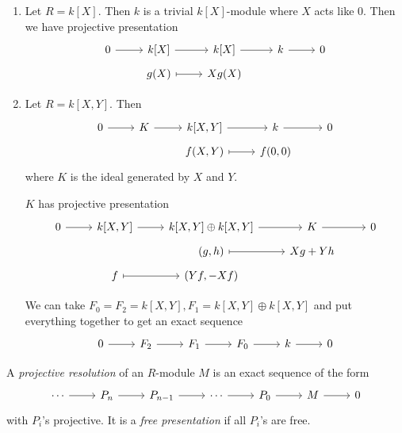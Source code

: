 \documentclass[a4paper]{article}
\begin{document}
\begin{eg}\leavevmode
  \begin{enumerate}
  \item Let \(R = k[X]\). Then \(k\) is a trivial \(k[X]\)-module where \(X\) acts like \(0\). Then we have projective presentation
    \[
      \begin{tikzcd}[row sep=tiny]
        0 \ar[r] & k[X] \ar[r] & k[X] \ar[r] & k \ar[r] & 0 \\
        & g(X) \ar[r, mapsto] & Xg(X)
      \end{tikzcd}
    \]
  \item Let \(R = k[X, Y]\). Then
    \[
      \begin{tikzcd}[row sep=tiny]
        0 \ar[r] & K \ar[r] & k[X, Y] \ar[r] & k \ar[r] & 0 \\
        & & f(X, Y) \ar[r, mapsto] & f(0, 0)
      \end{tikzcd}
    \]
    where \(K\) is the ideal generated by \(X\) and \(Y\).

    \(K\) has projective presentation
    \[
      \begin{tikzcd}[row sep=tiny]
        0 \ar[r] & k[X, Y] \ar[r] & k[X, Y] \oplus k[X, Y] \ar[r] & K \ar[r] & 0 \\
        & & (g, h) \ar[r, mapsto] & Xg + Yh \\
        & f \ar[r, mapsto] & (Yf, - Xf)
      \end{tikzcd}
    \]

    We can take \(F_0 = F_2 = k[X, Y], F_1 = k[X, Y] \oplus k[X, Y]\) and put everything together to get an exact sequence
    \[
      \begin{tikzcd}
        0 \ar[r] & F_2 \ar[r] & F_1 \ar[r] & F_0 \ar[r] & k \ar[r] & 0
      \end{tikzcd}
    \]
  \end{enumerate}
\end{eg}

\begin{definition}
  A \emph{projective resolution} of an \(R\)-module \(M\) is an exact sequence of the form
  \[
    \begin{tikzcd}
      \cdots \ar[r] & P_n \ar[r] & P_{n - 1} \ar[r] & \cdots \ar[r] & P_0 \ar[r] & M \ar[r] & 0
    \end{tikzcd}
  \]
  with \(P_i\)'s projective. It is a \emph{free presentation} if all \(P_i\)'s are free.
\end{definition}
\end{document}

